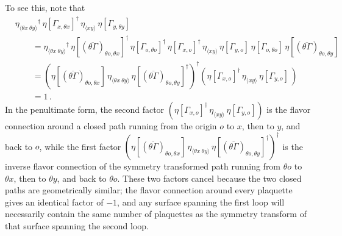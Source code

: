 \documentclass [12pt]{article}
\begin{document}
    To see this, note that
    \begin{align}
	    &\eta_{\langle \theta x \> \theta y \rangle}{}^\dagger \,
	    \eta[\Gamma_{x,\theta x}]^\dagger \,
	    \eta_{\langle xy \rangle} \,
	    \eta[\Gamma_{y,\theta y}]
	\nonumber\\ &\qquad {} =
	    \eta_{\langle \theta x \> \theta y \rangle}{}^\dagger \,
	    \eta[(\overline{\theta \Gamma})_{\theta o,\theta x}]^\dagger \,
	    \eta[\Gamma_{o,\theta o}]^\dagger \,
	    \eta[\Gamma_{x,o}]^\dagger \,
	    \eta_{\langle xy \rangle} \,
	    \eta[\Gamma_{y,o}] \,
	    \eta[\Gamma_{o,\theta o}] \,
	    \eta[(\overline{\theta \Gamma})_{\theta o,\theta y}]
	\nonumber\\ &\qquad {} =
	    \left(
	    \eta[(\overline{\theta \Gamma})_{\theta o,\theta x}] \,
	    \eta_{\langle \theta x \> \theta y \rangle} \,
	    \eta[(\overline{\theta \Gamma})_{\theta o,\theta y}]^\dagger
	    \right)^\dagger
	    \left(
	    \eta[\Gamma_{x,o}]^\dagger \,
	    \eta_{\langle xy \rangle} \,
	    \eta[\Gamma_{y,o}] \,
	    \right)
	\nonumber\\ & \qquad {} = 1 \,.
    \end{align}
    In the penultimate form, the second factor
    $
	    \left(
	    \eta[\Gamma_{x,o}]^\dagger \,
	    \eta_{\langle xy \rangle} \,
	    \eta[\Gamma_{y,o}]
	    \right)
    $
    is the flavor connection around a closed path running from the origin $o$ to $x$,
    then to $y$, and back to $o$,
    while the first factor
    $
	    \left(
	    \eta[(\overline{\theta \Gamma})_{\theta o,\theta x}] \,
	    \eta_{\langle \theta x \> \theta y \rangle} \,
	    \eta[(\overline{\theta \Gamma})_{\theta o,\theta y}]^\dagger
	    \right)^\dagger
    $
    is the inverse flavor connection of the symmetry transformed path running from
    $\theta o$ to $\theta x$, then to $\theta y$, and back to $\theta o$.
    These two factors cancel because the two closed paths are geometrically similar;
    the flavor connection around every plaquette gives an identical
    factor of $-1$, and any surface spanning the first loop will
    necessarily contain the same number of plaquettes as the symmetry
    transform of that surface spanning the second loop.
\end{document}
